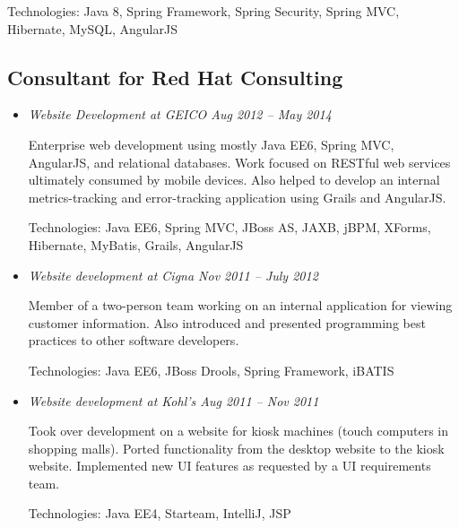 \documentclass[a4paper,11pt]{article}
\begin{document}
Technologies: Java 8, Spring Framework, Spring Security, Spring MVC, Hibernate, MySQL, AngularJS

\subsection*{Consultant for Red Hat Consulting}

  \vskip 5pt
  \begin{itemize}

    \item \textit{Website Development at GEICO \hfill Aug 2012 -- May 2014}

      Enterprise web development using mostly Java EE6, Spring MVC, AngularJS, and relational
      databases. Work focused on RESTful web services ultimately consumed by mobile devices. Also
      helped to develop an internal metrics-tracking and error-tracking application using Grails and
      AngularJS.

      Technologies: Java EE6, Spring MVC, JBoss AS, JAXB, jBPM, XForms, Hibernate, MyBatis, Grails,
      AngularJS

%

    \item \textit{Website development at Cigna \hfill Nov 2011 -- July 2012}

      Member of a two-person team working on an internal application for viewing customer
      information. Also introduced and presented programming best practices to other software
      developers.

      Technologies: Java EE6, JBoss Drools, Spring Framework, iBATIS

    \item \textit{Website development at Kohl's \hfill Aug 2011 -- Nov 2011}

      Took over development on a website for kiosk machines (touch computers in shopping
      malls). Ported functionality from the desktop website to the kiosk website. Implemented new UI
      features as requested by a UI requirements team.

      Technologies: Java EE4, Starteam, IntelliJ, JSP

  \end{itemize}
\end{document}
